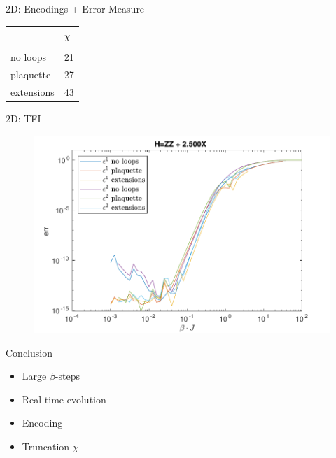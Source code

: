 \begin{frame}{2D: Encodings + Error Measure}
\begin{minipage}{.6\textwidth}
    \end{minipage}
    \begin{minipage}{.39\textwidth}
        \begin{table}[]
            \begin{tabular}{l|l }
                           & $\chi$ \\
                \hline              \\
                no loops   & 21     \\
                plaquette  & 27     \\
                extensions & 43     \\
            \end{tabular}
        \end{table}

    \end{minipage}

\end{frame}

\begin{frame}{2D: TFI}

    \begin{figure}
        \center
        \includegraphics[height=\textheight]{../Figuren/benchmarking/2D_Err01_t_sing.pdf}
    \end{figure}

\end{frame}

\begin{frame}{Conclusion}
    \begin{itemize}
        \item Large $\beta$-steps
        \item Real time evolution
        \item Encoding
        \item Truncation $\chi$
    \end{itemize}
\end{frame}

